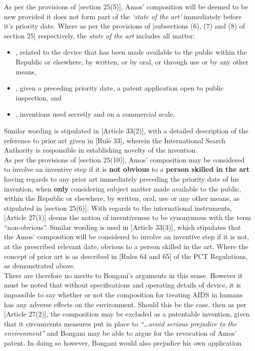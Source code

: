 \documentclass[11pt]{article}
\begin{document}
As per the provisions of [section 25(5)]\cite{rsa78_patents_act}, Amos' composition will be deemed to be new provided it does not
form part of the \emph{`state of the art'} immediately before it's priority date. Where as per the provisions of [subsections (6), (7)
and (8) of section 25]\cite{rsa78_patents_act} respectively, the \emph{state of the art} includes all matter:
\begin{itemize}
\item\relax [subsection (6)], related to the device that has been made available to the public within the Republic or elsewhere, by written, or by oral, or through use or by any other means,
\item\relax [subsection (7)], given a preceding priority date, a patent application open to public inspection, and
\item\relax [subsection (8)], inventions used secretly and on a commercial scale.
\end{itemize}

Similar wording is stipulated in [Article 33(2)]\cite{wipo70_pct}, with a detailed description of the reference to prior art given in [Rule 33]\cite{wipo70_pct_reg}, wherein the International Search Authority is responsible in establishing novelty of the invention.\\

As per the provisions of [section 25(10)]\cite{rsa78_patents_act}, Amos' composition may be considered to involve an inventive step
if it is \textbf{not obvious} to a \textbf{person skilled in the art} having regards to any prior art immediately preceding the priority date of
his invention, when \textbf{only} considering subject matter made available to the public, within the Republic or elsewhere, by written,
oral, use or any other means, as stipulated in [section 25(6)]\cite{rsa78_patents_act}. With regards to the international
instruments, [Article 27(1)]\cite{wto17_trips} deems the notion of inventiveness to be synonymous with the term ``non-obvious''.
Similar wording is used in [Article 33(3)]\cite{wipo70_pct}, which stipulates that the Amos' composition will be considered to
involve an inventive step if it is not, at the prescribed relevant date, obvious to a person skilled in the art. Where the concept
of prior art is as described in [Rules 64 and 65]\cite{wipo70_pct_reg} of the PCT Regulations, as demonstrated above.\\

There are therefore no merits to Bongani's arguments in this sense. However it must be noted that without specifications and
operating details of device, it is impossible to say whether or not the composition for treating AIDS in humans has any adverse
effects on the environment. Should this be the case, then as per [Article 27(2)]\cite{wto17_trips}, the composition may be excluded
as a patentable invention, given that it circumvents measures put in place to \emph{``\ldots{}avoid serious prejudice to the environment''}
and Bongani may be able to argue for the revocation of Amos' patent. In doing so however, Bongani would also prejudice his own
application.
\end{document}
